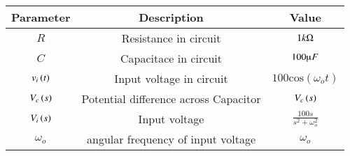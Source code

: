 \begin{tabular}{|c|c|c|}
    \hline
    \textbf{Parameter} & \textbf{Description} & \textbf{Value} \\
    \hline
    $R$ & Resistance in circuit & $ 1k\ohm$ \\
    \hline
    $C$ & Capacitace in circuit & $ 100\micro F$ \\
    \hline
    $v_i\left(t\right)$ & Input voltage in circuit & $ 100\text{cos}(\omega_o t)$ \\
    \hline
    $V_c\left(s\right)$ & Potential difference across Capacitor & $V_c\left(s\right)$ \\
    \hline
    $V_i\left(s\right)$ & Input voltage & $ \frac{100s}{s^2+ \omega_o^2}$\\
    \hline
    $\omega_o$ & angular frequency of input voltage& $ \omega_o$\\
    \hline
\end{tabular}



